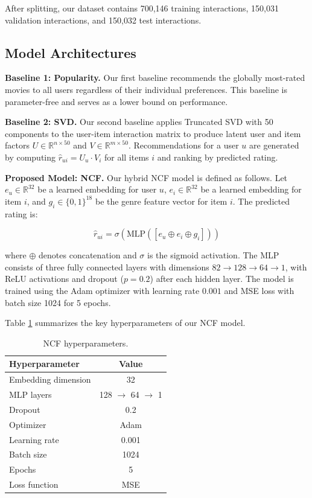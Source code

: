 \documentclass{article}
\begin{document}
After splitting, our dataset contains 700,146 training interactions, 150,031 validation interactions, and 150,032 test interactions.

\subsection{Model Architectures}

\textbf{Baseline 1: Popularity.} Our first baseline recommends the globally most-rated movies to all users regardless of their individual preferences. This baseline is parameter-free and serves as a lower bound on performance.

\textbf{Baseline 2: SVD.} Our second baseline applies Truncated SVD with 50 components to the user-item interaction matrix to produce latent user and item factors $U \in \mathbb{R}^{n \times 50}$ and $V \in \mathbb{R}^{m \times 50}$. Recommendations for a user $u$ are generated by computing $\hat{r}_{ui} = U_u \cdot V_i$ for all items $i$ and ranking by predicted rating.

\textbf{Proposed Model: NCF.} Our hybrid NCF model is defined as follows. Let $e_u \in \mathbb{R}^{32}$ be a learned embedding for user $u$, $e_i \in \mathbb{R}^{32}$ be a learned embedding for item $i$, and $g_i \in \{0,1\}^{18}$ be the genre feature vector for item $i$. The predicted rating is:

\begin{equation}
\hat{r}_{ui} = \sigma\left(\text{MLP}\left([e_u \oplus e_i \oplus g_i]\right)\right)
\end{equation}

where $\oplus$ denotes concatenation and $\sigma$ is the sigmoid activation. The MLP consists of three fully connected layers with dimensions $82 \rightarrow 128 \rightarrow 64 \rightarrow 1$, with ReLU activations and dropout ($p = 0.2$) after each hidden layer. The model is trained using the Adam optimizer with learning rate $0.001$ and MSE loss with batch size 1024 for 5 epochs.

Table \ref{tab:hyperparams} summarizes the key hyperparameters of our NCF model.

\begin{table}[H]
\centering
\caption{NCF hyperparameters.}
\label{tab:hyperparams}
\begin{tabular}{lc}
\toprule
Hyperparameter & Value \\
\midrule
Embedding dimension & 32 \\
MLP layers & 128 $\rightarrow$ 64 $\rightarrow$ 1 \\
Dropout & 0.2 \\
Optimizer & Adam \\
Learning rate & 0.001 \\
Batch size & 1024 \\
Epochs & 5 \\
Loss function & MSE \\
\bottomrule
\end{tabular}
\end{table}
\end{document}
